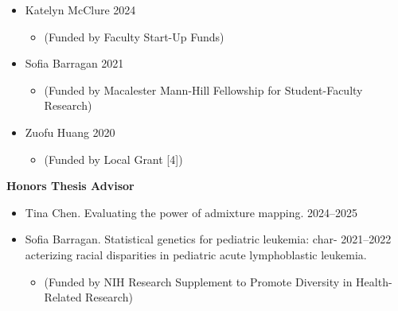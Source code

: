 \documentclass[margin]{res}
\begin{document}
\begin{resume}
\begin{itemize}
\item Katelyn McClure \hfill 2024 
	\begin{itemize}[leftmargin=-0in] \vspace{-0.2cm}
	\item[]\begin{footnotesize}(Funded by Faculty Start-Up Funds) \end{footnotesize}
	\end{itemize}

\item Sofia Barragan \hfill 2021 
	\begin{itemize}[leftmargin=-0in] \vspace{-0.2cm}
	\item[]\begin{footnotesize}(Funded by Macalester Mann-Hill Fellowship for Student-Faculty Research) \end{footnotesize}
	\end{itemize}

\item Zuofu Huang \hfill 2020 
	\begin{itemize}[leftmargin=-0in] \vspace{-0.2cm}
	\item[]\begin{footnotesize}(Funded by Local Grant [4]) \end{footnotesize}
	\end{itemize}
\end{itemize}


\textbf{Honors Thesis Advisor}
\begin{itemize}

\item Tina Chen. Evaluating the power of admixture mapping. \hfill 2024--2025

\item Sofia Barragan. Statistical genetics for pediatric leukemia: char- \hfill 2021--2022 \\ acterizing racial disparities in pediatric acute lymphoblastic leukemia.
	\begin{itemize}[leftmargin=-0in]  \vspace{-0.2cm}
	\item[]\begin{footnotesize}(Funded by NIH Research Supplement to Promote Diversity in Health-Related Research) \end{footnotesize}
	\end{itemize}


\end{itemize}
\end{resume}
\end{document}
